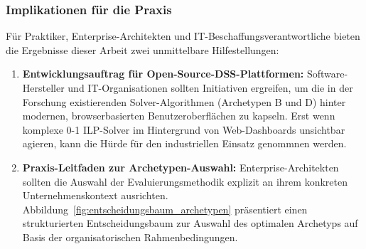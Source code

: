 \subsubsection{Implikationen für die Praxis}

Für Praktiker, Enterprise-Architekten und IT-Beschaffungsverantwortliche bieten die Ergebnisse dieser Arbeit zwei unmittelbare Hilfestellungen:

\begin{enumerate}
    \item \textbf{Entwicklungsauftrag für Open-Source-DSS-Plattformen:} Software-Hersteller und IT-Organisationen sollten Initiativen ergreifen, um die in der Forschung existierenden Solver-Algorithmen (Archetypen B und D) hinter modernen, browserbasierten Benutzeroberflächen zu kapseln. Erst wenn komplexe 0-1 ILP-Solver im Hintergrund von Web-Dashboards unsichtbar agieren, kann die Hürde für den industriellen Einsatz genommnen werden.
    
    \item \textbf{Praxis-Leitfaden zur Archetypen-Auswahl:} Enterprise-Architekten sollten die Auswahl der Evaluierungsmethodik explizit an ihrem konkreten Unternehmenskontext ausrichten. Abbildung~\ref{fig:entscheidungsbaum_archetypen} präsentiert einen strukturierten Entscheidungsbaum zur Auswahl des optimalen Archetyps auf Basis der organisatorischen Rahmenbedingungen.
\end{enumerate}

